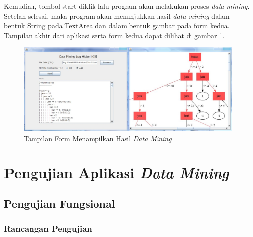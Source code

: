 Kemudian, tombol start diklik lalu program akan melakukan proses \textsl{data mining}. Setelah selesai, maka program akan menunjukkan hasil \textsl{data mining} dalam bentuk String pada TextArea dan dalam bentuk gambar pada form kedua. Tampilan akhir dari aplikasi serta form kedua dapat dilihat di gambar \ref{fig:GUI5}.

\begin{figure}[H]
\centering
\includegraphics[scale=0.5]{Gambar/GUI5.jpg}
\caption[Tampilan Form Menampilkan Hasil \textsl{Data Mining}]{Tampilan Form Menampilkan Hasil \textsl{Data Mining}} 
\label{fig:GUI5}
\end{figure}

\section{Pengujian Aplikasi \textsl{Data Mining}}

\subsection{Pengujian Fungsional}

\subsubsection{Rancangan Pengujian}

